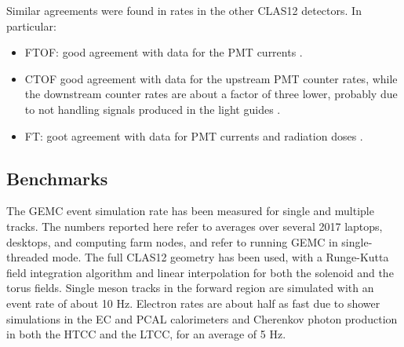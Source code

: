 


Similar agreements were found in rates in the other CLAS12 detectors. In particular:

\begin{itemize}
	\item FTOF: good agreement with data for the PMT currents \cite{ftof-nim}.
	\item CTOF good agreement with data for the upstream PMT counter rates, while the downstream counter rates
		  are about a factor of three lower, probably due to not handling signals produced in the light guides \cite{ctof-nim}.
	\item FT: goot agreement with data for PMT currents and radiation doses \cite{ft-nim}.
\end{itemize}


\subsection{Benchmarks}

The GEMC event simulation rate has been measured for single and multiple tracks. The numbers reported here
refer to averages over several 2017 laptops, desktops, and computing farm nodes, and refer to running GEMC in single-threaded mode.
The full CLAS12 geometry has been used, with a Runge-Kutta field integration algorithm
and linear interpolation for both the solenoid and the torus fields.
Single meson tracks in the forward region are simulated with an event rate of about 10 Hz.
Electron rates are about half as fast due to shower simulations in the EC and PCAL calorimeters and
Cherenkov photon production in both the HTCC and the LTCC, for an average of 5 Hz.

